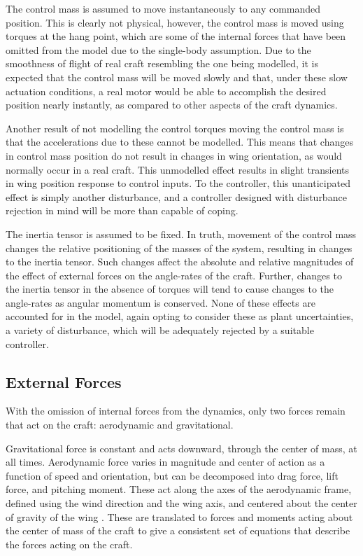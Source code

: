 \documentclass{sydeStyle}
\begin{document}
The control mass is assumed to move instantaneously to any commanded position.
This is clearly not physical, however, the control mass is moved using torques
at the hang point, which are some of the internal forces that have been omitted
from the model due to the single-body assumption. Due to the smoothness of
flight of real craft resembling the one being modelled, it is expected that the
control mass will be moved slowly and that, under these slow actuation
conditions, a real motor would be able to accomplish the desired position nearly
instantly, as compared to other aspects of the craft dynamics.

Another result of not modelling the control torques moving the control mass is
that the accelerations due to these cannot be modelled. This means that changes
in control mass position do not result in changes in wing orientation, as would
normally occur in a real craft. This unmodelled effect results in slight
transients in wing position response to control inputs. To the controller, this
unanticipated effect is simply another disturbance, and a controller designed
with disturbance rejection in mind will be more than capable of coping.

The inertia tensor is assumed to be fixed. In truth, movement of the control
mass changes the relative positioning of the masses of the system, resulting in
changes to the inertia tensor. Such changes affect the absolute and relative
magnitudes of the effect of external forces on the angle-rates of the craft.
Further, changes to the inertia tensor in the absence of torques will tend to
cause changes to the angle-rates as angular momentum is conserved. None of these
effects are accounted for in the model, again opting to consider these as plant
uncertainties, a variety of disturbance, which will be adequately rejected by a
suitable controller.

\subsection{External Forces}

With the omission of internal forces from the dynamics, only two forces remain
that act on the craft: aerodynamic and gravitational.

Gravitational force is constant and acts downward, through the center of mass,
at all times. Aerodynamic force varies in magnitude and center of action as a
function of speed and orientation, but can be decomposed into drag force, lift
force, and pitching moment. These act along the axes of the aerodynamic frame,
defined using the wind direction and the wing axis, and centered about the
center of gravity of the wing \cite{etkin}. These are translated to forces and
moments acting about the center of mass of the craft to give a consistent set of
equations that describe the forces acting on the craft.
\end{document}
